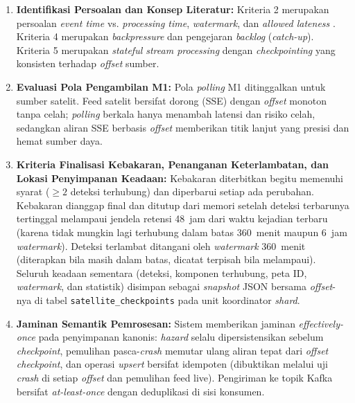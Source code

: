 \begin{enumerate}
    \item \textbf{Identifikasi Persoalan dan Konsep Literatur:} Kriteria 2 merupakan persoalan \textit{event time} vs. \textit{processing time}, \textit{watermark}, dan \textit{allowed lateness} \cite{akidau2015dataflow,kleppmann2017designing}. Kriteria 4 merupakan \textit{backpressure} dan pengejaran \textit{backlog} (\textit{catch-up}). Kriteria 5 merupakan \textit{stateful stream processing} dengan \textit{checkpointing} yang konsisten terhadap \textit{offset} sumber.
    \item \textbf{Evaluasi Pola Pengambilan M1:} Pola \textit{polling} M1 ditinggalkan untuk sumber satelit. Feed satelit bersifat dorong (SSE) dengan \textit{offset} monoton tanpa celah; \textit{polling} berkala hanya menambah latensi dan risiko celah, sedangkan aliran SSE berbasis \textit{offset} memberikan titik lanjut yang presisi dan hemat sumber daya.
    \item \textbf{Kriteria Finalisasi Kebakaran, Penanganan Keterlambatan, dan Lokasi Penyimpanan Keadaan:} Kebakaran diterbitkan begitu memenuhi syarat ($\ge 2$ deteksi terhubung) dan diperbarui setiap ada perubahan. Kebakaran dianggap final dan ditutup dari memori setelah deteksi terbarunya tertinggal melampaui jendela retensi 48~jam dari waktu kejadian terbaru (karena tidak mungkin lagi terhubung dalam batas 360~menit maupun 6~jam \textit{watermark}). Deteksi terlambat ditangani oleh \textit{watermark} 360~menit (diterapkan bila masih dalam batas, dicatat terpisah bila melampaui). Seluruh keadaan sementara (deteksi, komponen terhubung, peta ID, \textit{watermark}, dan statistik) disimpan sebagai \textit{snapshot} JSON bersama \textit{offset}-nya di tabel \texttt{satellite\_checkpoints} pada unit koordinator \textit{shard}.
    \item \textbf{Jaminan Semantik Pemrosesan:} Sistem memberikan jaminan \textit{effectively-once} pada penyimpanan kanonis: \textit{hazard} selalu dipersistensikan sebelum \textit{checkpoint}, pemulihan pasca-\textit{crash} memutar ulang aliran tepat dari \textit{offset} \textit{checkpoint}, dan operasi \textit{upsert} bersifat idempoten (dibuktikan melalui uji \textit{crash} di setiap \textit{offset} dan pemulihan feed live). Pengiriman ke topik Kafka bersifat \textit{at-least-once} dengan deduplikasi di sisi konsumen.
\end{enumerate}
